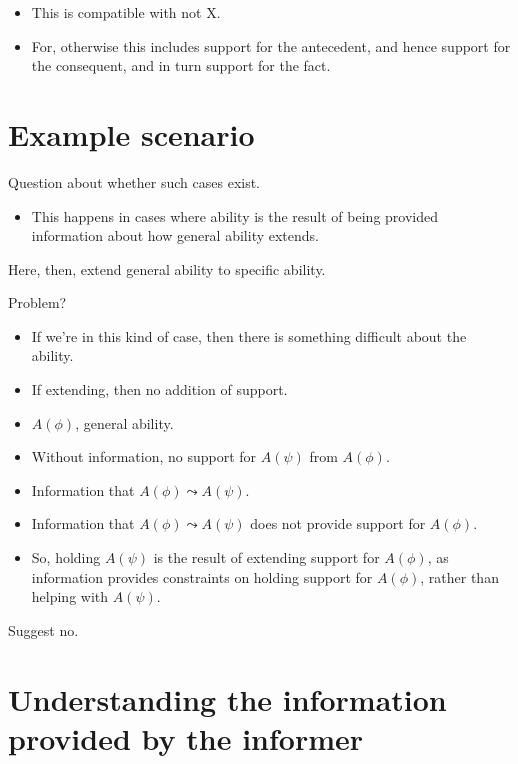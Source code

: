 \begin{itemize}
\item This is compatible with not X.
\item For, otherwise this includes support for the antecedent, and hence support for the consequent, and in turn support for the fact.
\end{itemize}

\section{Example scenario}
\label{sec:example-cases}

Question about whether such cases exist.

\begin{itemize}
\item This happens in cases where ability is the result of being provided information about how general ability extends.
\end{itemize}

Here, then, extend general ability to specific ability.

Problem?

\begin{itemize}
\item If we're in this kind of case, then there is something difficult about the ability.
\end{itemize}

\begin{itemize}
\item If extending, then no addition of support.
\end{itemize}

\begin{itemize}
\item \(A(\phi)\), general ability.
\item Without information, no support for \(A(\psi)\) from \(A(\phi)\).
\item Information that \(A(\phi) \leadsto A(\psi)\).
\item Information that \(A(\phi) \leadsto A(\psi)\) does not provide support for \(A(\phi)\).
\item So, holding \(A(\psi)\) is the result of extending support for \(A(\phi)\), as information provides constraints on holding support for \(A(\phi)\), rather than helping with \(A(\psi)\).
\end{itemize}


Suggest no.

\section{Understanding the information provided by the informer}
\label{sec:underst-cond-inform}

